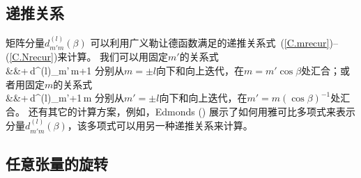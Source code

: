 \subsection{递推关系}

矩阵分量$d^{(l)}_{m'm}(\beta)$ 可以利用广义勒让德函数满足的递推关系式~(\ref{C.mrecur})--(\ref{C.Nrecur})来计算。
我们可以用固定$m'$的关系式
\eqa \label{C.mrecur2}
 \nonumber \\
&&\mbox{}+\half{}\,d^{(l)}_{m'\,m+1}
\ena
分别从$m=\pm l$向下和向上迭代，在$m=m'\cos\beta$处汇合；或者用固定$m$的关系式
\eqa \label{C.mprecur}
 \nonumber \\
&&\mbox{}+\half{}\,d^{(l)}_{m'+1\,m}
\ena
分别从$m'=\pm l$向下和向上迭代，在$m'=m(\cos\beta)^{-1}$处汇合。
还有其它的计算方案，例如，Edmonds (\citeyear{edmonds60}) 
展示了如何用雅可比多项式来表示分量$d^{(l)}_{m'm}(\beta)$，该多项式可以用另一种递推关系来计算。

\subsection{任意张量的旋转}

